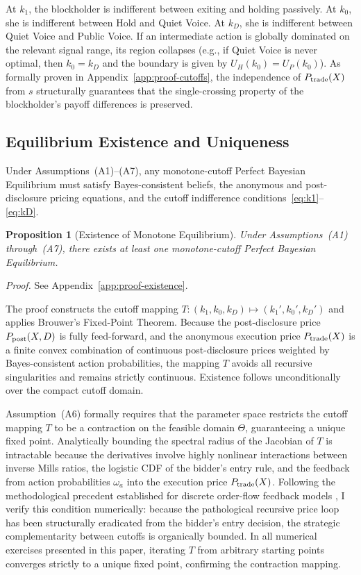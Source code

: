 \documentclass[11pt]{article}
\newtheorem{proposition}{Proposition}
\newcommand{\1}{\mathbf{1}}
\begin{document}
At $k_1$, the blockholder is indifferent between exiting and holding passively. At $k_0$, she is indifferent between Hold and Quiet Voice. At $k_D$, she is indifferent between Quiet Voice and Public Voice. If an intermediate action is globally dominated on the relevant signal range, its region collapses (e.g., if Quiet Voice is never optimal, then $k_0=k_D$ and the boundary is given by $U_H(k_0)=U_P(k_0)$). As formally proven in Appendix~\ref{app:proof-cutoffs}, the independence of $P_{\textup{trade}}(X)$ from $s$ structurally guarantees that the single-crossing property of the blockholder's payoff differences is preserved.

%
\subsection{Equilibrium Existence and Uniqueness}

Under Assumptions~\textup{(A1)}--\textup{(A7)}, any monotone-cutoff Perfect Bayesian Equilibrium must satisfy Bayes-consistent beliefs, the anonymous and post-disclosure pricing equations, and the cutoff indifference conditions~\eqref{eq:k1}--\eqref{eq:kD}.

\begin{proposition}[Existence of Monotone Equilibrium]
\label{prop:existence}
Under Assumptions~\textup{(A1)} through~\textup{(A7)}, there exists at least one monotone-cutoff Perfect Bayesian Equilibrium.
\end{proposition}
\textit{Proof.} See Appendix~\ref{app:proof-existence}.

The proof constructs the cutoff mapping $T:(k_1,k_0,k_D)\mapsto(k_1',k_0',k_D')$ and applies Brouwer's Fixed-Point Theorem. Because the post-disclosure price $P_{\textup{post}}(X,D)$ is fully feed-forward, and the anonymous execution price $P_{\textup{trade}}(X)$ is a finite convex combination of continuous post-disclosure prices weighted by Bayes-consistent action probabilities, the mapping $T$ avoids all recursive singularities and remains strictly continuous. Existence follows unconditionally over the compact cutoff domain.

Assumption~\textup{(A6)} formally requires that the parameter space restricts the cutoff mapping $T$ to be a contraction on the feasible domain $\Theta$, guaranteeing a unique fixed point. Analytically bounding the spectral radius of the Jacobian of $T$ is intractable because the derivatives involve highly nonlinear interactions between inverse Mills ratios, the logistic CDF of the bidder's entry rule, and the feedback from action probabilities $\omega_a$ into the execution price $P_{\textup{trade}}(X)$. Following the methodological precedent established for discrete order-flow feedback models \citep{EdmansGoldsteinJiang2015}, I verify this condition numerically: because the pathological recursive price loop has been structurally eradicated from the bidder's entry decision, the strategic complementarity between cutoffs is organically bounded. In all numerical exercises presented in this paper, iterating $T$ from arbitrary starting points converges strictly to a unique fixed point, confirming the contraction mapping.
\end{document}
